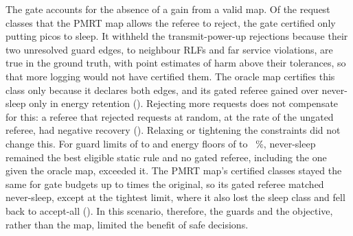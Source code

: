 \label{sec:disc_decision}
The gate accounts for the absence of a gain from a valid map. Of the request classes that the PMRT map allows the
referee to reject, the gate certified only putting picos to sleep. It withheld the transmit-power-up rejections because
their two unresolved guard edges, to neighbour RLFs and far service violations, are true in the ground truth, with
point estimates of harm above their tolerances, so that more logging would not have certified them. The oracle map
certifies this class only because it declares both edges, and its gated referee gained over never-sleep only in energy
retention (). Rejecting more requests does not
compensate for this: a referee that rejected requests at random, at the rate of the ungated referee, had negative
recovery (). Relaxing or tightening the constraints did not change this. For guard limits
of  to  and energy floors of  to ~\%, never-sleep remained
the best eligible static rule and no gated referee, including the one given the oracle map, exceeded it. The PMRT map's
certified classes stayed the same for gate budgets up to  times the original, so its gated
referee matched never-sleep, except at the tightest limit, where it also lost the sleep class and fell back to
accept-all (). In this scenario, therefore, the guards and the objective, rather than the map, limited the
benefit of safe decisions.
